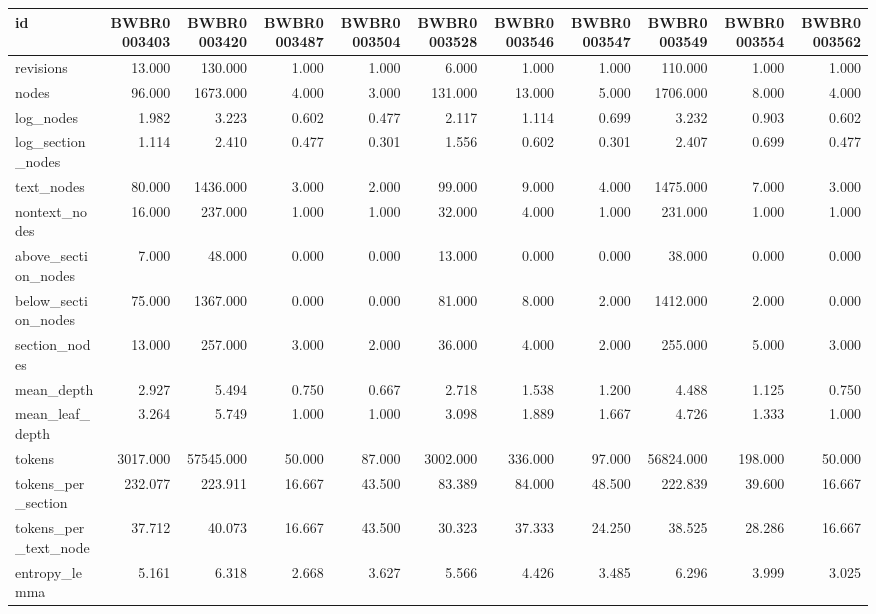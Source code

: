\begin{tabular}{lrrrrrrrrrr}
\toprule
id & BWBR0003403 & BWBR0003420 & BWBR0003487 & BWBR0003504 & BWBR0003528 & BWBR0003546 & BWBR0003547 & BWBR0003549 & BWBR0003554 & BWBR0003562 \\
\midrule
revisions & 13.000 & 130.000 & 1.000 & 1.000 & 6.000 & 1.000 & 1.000 & 110.000 & 1.000 & 1.000 \\
\cline{1-11}
nodes & 96.000 & 1673.000 & 4.000 & 3.000 & 131.000 & 13.000 & 5.000 & 1706.000 & 8.000 & 4.000 \\
\cline{1-11}
log\_nodes & 1.982 & 3.223 & 0.602 & 0.477 & 2.117 & 1.114 & 0.699 & 3.232 & 0.903 & 0.602 \\
\cline{1-11}
log\_section\_nodes & 1.114 & 2.410 & 0.477 & 0.301 & 1.556 & 0.602 & 0.301 & 2.407 & 0.699 & 0.477 \\
\cline{1-11}
text\_nodes & 80.000 & 1436.000 & 3.000 & 2.000 & 99.000 & 9.000 & 4.000 & 1475.000 & 7.000 & 3.000 \\
\cline{1-11}
nontext\_nodes & 16.000 & 237.000 & 1.000 & 1.000 & 32.000 & 4.000 & 1.000 & 231.000 & 1.000 & 1.000 \\
\cline{1-11}
above\_section\_nodes & 7.000 & 48.000 & 0.000 & 0.000 & 13.000 & 0.000 & 0.000 & 38.000 & 0.000 & 0.000 \\
\cline{1-11}
below\_section\_nodes & 75.000 & 1367.000 & 0.000 & 0.000 & 81.000 & 8.000 & 2.000 & 1412.000 & 2.000 & 0.000 \\
\cline{1-11}
section\_nodes & 13.000 & 257.000 & 3.000 & 2.000 & 36.000 & 4.000 & 2.000 & 255.000 & 5.000 & 3.000 \\
\cline{1-11}
mean\_depth & 2.927 & 5.494 & 0.750 & 0.667 & 2.718 & 1.538 & 1.200 & 4.488 & 1.125 & 0.750 \\
\cline{1-11}
mean\_leaf\_depth & 3.264 & 5.749 & 1.000 & 1.000 & 3.098 & 1.889 & 1.667 & 4.726 & 1.333 & 1.000 \\
\cline{1-11}
tokens & 3017.000 & 57545.000 & 50.000 & 87.000 & 3002.000 & 336.000 & 97.000 & 56824.000 & 198.000 & 50.000 \\
\cline{1-11}
tokens\_per\_section & 232.077 & 223.911 & 16.667 & 43.500 & 83.389 & 84.000 & 48.500 & 222.839 & 39.600 & 16.667 \\
\cline{1-11}
tokens\_per\_text\_node & 37.712 & 40.073 & 16.667 & 43.500 & 30.323 & 37.333 & 24.250 & 38.525 & 28.286 & 16.667 \\
\cline{1-11}
entropy\_lemma & 5.161 & 6.318 & 2.668 & 3.627 & 5.566 & 4.426 & 3.485 & 6.296 & 3.999 & 3.025 \\

\end{tabular}
